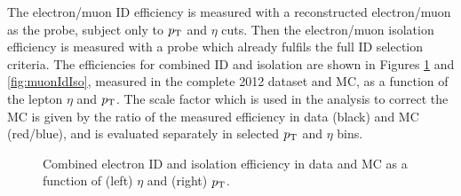 The electron/muon ID efficiency is measured with a reconstructed
electron/muon as the probe, subject only to $\pt$ and $\eta$ cuts. 
Then the electron/muon isolation efficiency is measured
with a probe which already fulfils the full ID selection criteria. 
The efficiencies for combined ID and isolation are shown in Figures
\ref{fig:electronIdIso} and \ref{fig:muonIdIso}, measured in the complete 2012
dataset and \ac{MC}, as a function of the lepton $\eta$ and $\pt$.
The scale factor which is used in the analysis to correct the \ac{MC} is given by the ratio of the
measured efficiency in data (black) and \ac{MC} (red/blue), and is evaluated separately in
selected $\pt$ and $\eta$ bins.

\begin{figure}[htb]
\caption[Combined electron ID and isolation efficiency in data and MC as a
function of (left) $\eta$ and (right) $\pt$.]
{Combined electron ID and isolation efficiency in data and \ac{MC} as a
function of (left) $\eta$ and (right) $\pt$.}
\label{fig:electronIdIso}
\end{figure}

